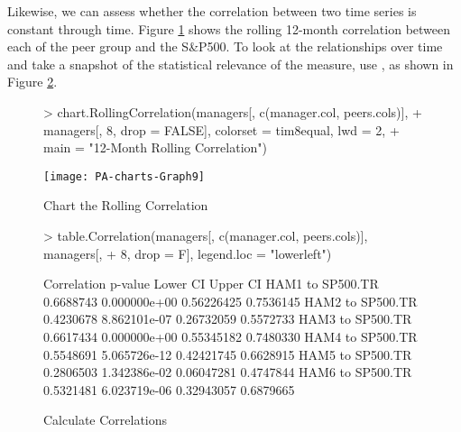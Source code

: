 \documentclass[12pt,letterpaper,english]{article}
\begin{document}
Likewise, we can assess whether the correlation between two time series
is constant through time. Figure \ref{fig:Rolling-Correlation} shows
the rolling 12-month correlation between each of the peer group and
the S\&P500. To look at the relationships over time and take a snapshot
of the statistical relevance of the measure, use ,
as shown in Figure \ref{fig:Calculate-Correlations}.

%
\begin{figure}

\caption{Chart the Rolling Correlation}

\label{fig:Rolling-Correlation}

\begin{center}

\begin{Schunk}
\begin{Sinput}
> chart.RollingCorrelation(managers[, c(manager.col, peers.cols)], 
+     managers[, 8, drop = FALSE], colorset = tim8equal, lwd = 2, 
+     main = "12-Month Rolling Correlation")
\end{Sinput}
\end{Schunk}
\texttt{[image: PA-charts-Graph9]}

\end{center}
\end{figure}


%
\begin{figure}

\caption{Calculate Correlations}

\label{fig:Calculate-Correlations}

\begin{Schunk}
\begin{Sinput}
> table.Correlation(managers[, c(manager.col, peers.cols)], managers[, 
+     8, drop = F], legend.loc = "lowerleft")
\end{Sinput}
\begin{Soutput}
                 Correlation      p-value   Lower CI  Upper CI
HAM1 to SP500.TR   0.6688743 0.000000e+00 0.56226425 0.7536145
HAM2 to SP500.TR   0.4230678 8.862101e-07 0.26732059 0.5572733
HAM3 to SP500.TR   0.6617434 0.000000e+00 0.55345182 0.7480330
HAM4 to SP500.TR   0.5548691 5.065726e-12 0.42421745 0.6628915
HAM5 to SP500.TR   0.2806503 1.342386e-02 0.06047281 0.4747844
HAM6 to SP500.TR   0.5321481 6.023719e-06 0.32943057 0.6879665
\end{Soutput}
\end{Schunk}
\end{figure}
\end{document}
